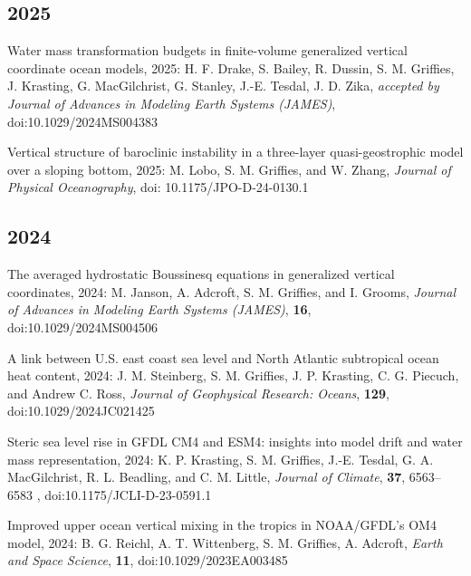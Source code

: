 \begin{etaremune}

\subsection*{\sc \color{Maroon} 2025}

\item Water mass transformation budgets in finite-volume generalized vertical coordinate ocean models, 2025: H. F. Drake, S. Bailey, R. Dussin, S. M. Griffies, J. Krasting, G. MacGilchrist, G. Stanley, J.-E. Tesdal, J. D. Zika, {\it accepted by Journal of Advances in Modeling Earth Systems (JAMES)}, doi:10.1029/2024MS004383

\item Vertical structure of baroclinic instability in a three-layer quasi-geostrophic model over a sloping bottom, 2025: M. Lobo, S. M. Grif\/f\/ies, and W. Zhang, {\it Journal of Physical Oceanography}, 
doi: 10.1175/JPO-D-24-0130.1

\subsection*{\sc \color{Maroon} 2024}

\item The averaged hydrostatic Boussinesq equations in generalized vertical coordinates, 2024: M. Janson, A. Adcroft, S. M. Grif\/f\/ies, and I. Grooms, {\it Journal of Advances in Modeling Earth Systems (JAMES)}, {\bf 16}, doi:10.1029/2024MS004506

\item A link between U.S. east coast sea level and North Atlantic subtropical ocean heat content, 2024:  J. M. Steinberg, S. M. Grif\/f\/ies, J. P. Krasting, C. G. Piecuch, and Andrew C. Ross, {\it Journal of Geophysical Research: Oceans}, {\bf 129}, doi:10.1029/2024JC021425




\item Steric sea level rise in GFDL CM4 and ESM4: insights into model drift and water mass representation, 2024: K. P. Krasting, S. M. Grif\/f\/ies, J.-E. Tesdal, G. A. MacGilchrist, R. L. Beadling, and C. M. Little, {\it  Journal of Climate}, {\bf 37}, 6563–6583 , doi:10.1175/JCLI-D-23-0591.1

\item Improved upper ocean vertical mixing in the tropics in NOAA/GFDL's OM4 model, 2024: B. G. Reichl, A. T. Wittenberg, S. M. Grif\/f\/ies, A. Adcroft, {\it Earth and Space Science}, {\bf 11}, doi:10.1029/2023EA003485


\end{etaremune}
